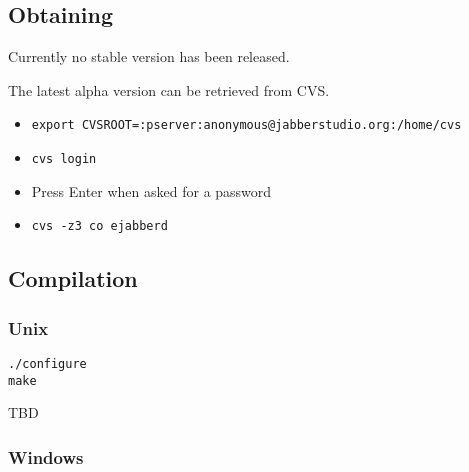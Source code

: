 \documentclass[10pt]{article}
\begin{document}
\subsection{Obtaining}
\label{sec:obtaining}

Currently no stable version has been released.

The latest alpha version can be retrieved from CVS\@.
\begin{itemize}
\item \texttt{export CVSROOT=:pserver:anonymous@jabberstudio.org:/home/cvs}
\item \texttt{cvs login}
\item Press Enter when asked for a password
\item \texttt{cvs -z3 co ejabberd}
\end{itemize}



\subsection{Compilation}
\label{sec:compilation}
\subsubsection{Unix}
\label{sec:compilationunix}

\begin{verbatim}
./configure
make
\end{verbatim}

TBD

\subsubsection{Windows}
\label{sec:compilationwin}
\end{document}
